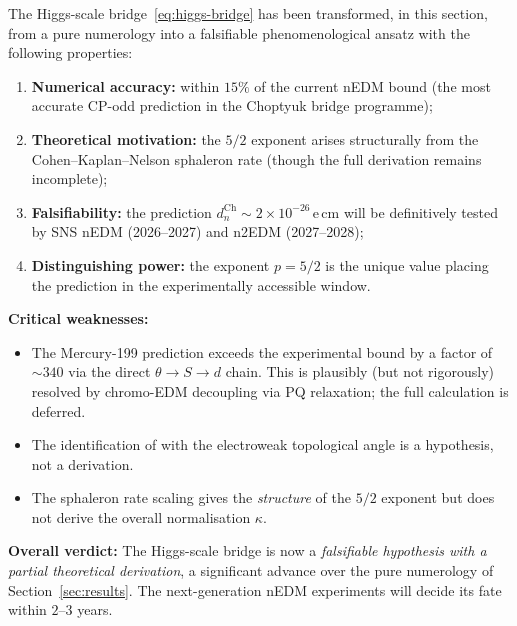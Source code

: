 \begin{verdict}
The Higgs-scale bridge~\eqref{eq:higgs-bridge} has been transformed, in
this section, from a pure numerology into a falsifiable phenomenological
ansatz with the following properties:
\begin{enumerate}[leftmargin=2em,itemsep=0.2em]
  \item \textbf{Numerical accuracy:} within $15\%$ of the current nEDM
        bound (the most accurate CP-odd prediction in the Choptyuk
        bridge programme);
  \item \textbf{Theoretical motivation:} the $5/2$ exponent arises
        structurally from the Cohen--Kaplan--Nelson sphaleron rate
        (though the full derivation remains incomplete);
  \item \textbf{Falsifiability:} the prediction
        $d_n^{\mathrm{Ch}}\sim 2\times 10^{-26}\,$e\,cm will be
        definitively tested by SNS nEDM (2026--2027) and n2EDM (2027--2028);
  \item \textbf{Distinguishing power:} the exponent $p=5/2$ is the
        unique value placing the prediction in the experimentally
        accessible window.
\end{enumerate}

\textbf{Critical weaknesses:}
\begin{itemize}[leftmargin=2em,itemsep=0.1em]
  \item The Mercury-199 prediction exceeds the experimental bound by a
        factor of $\sim 340$ via the direct $\theta\to S\to d$ chain.
        This is plausibly (but not rigorously) resolved by chromo-EDM
        decoupling via PQ relaxation; the full calculation is deferred.
  \item The identification of \aC{} with the electroweak topological
        angle is a hypothesis, not a derivation.
  \item The sphaleron rate scaling gives the \emph{structure} of the
        $5/2$ exponent but does not derive the overall normalisation
        $\kappa$.
\end{itemize}

\textbf{Overall verdict:} The Higgs-scale bridge is now a
\emph{falsifiable hypothesis with a partial theoretical derivation},
a significant advance over the pure numerology of Section~\ref{sec:results}.
The next-generation nEDM experiments will decide its fate within
$2$--$3$ years.
\end{verdict}


